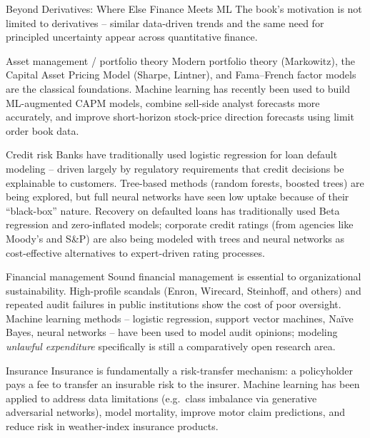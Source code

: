 \documentclass[aspectratio=169,10pt]{beamer}
\begin{document}
\begin{frame}[allowframebreaks]{Beyond Derivatives: Where Else Finance Meets ML}
  The book's motivation is not limited to derivatives -- similar
  data-driven trends and the same need for principled uncertainty appear
  across quantitative finance.

  \begin{block}{Asset management / portfolio theory}
    Modern portfolio theory (Markowitz), the Capital Asset Pricing Model
    (Sharpe, Lintner), and Fama--French factor models are the classical
    foundations. Machine learning has recently been used to build
    ML-augmented CAPM models, combine sell-side analyst forecasts more
    accurately, and improve short-horizon stock-price direction forecasts
    using limit order book data.
  \end{block}

  \begin{block}{Credit risk}
    Banks have traditionally used logistic regression for loan default
    modeling -- driven largely by regulatory requirements that credit
    decisions be explainable to customers. Tree-based methods (random
    forests, boosted trees) are being explored, but full neural networks
    have seen low uptake because of their ``black-box'' nature. Recovery on
    defaulted loans has traditionally used Beta regression and zero-inflated
    models; corporate credit ratings (from agencies like Moody's and S\&P)
    are also being modeled with trees and neural networks as
    cost-effective alternatives to expert-driven rating processes.
  \end{block}

  \framebreak

  \begin{block}{Financial management}
    Sound financial management is essential to organizational
    sustainability. High-profile scandals (Enron, Wirecard, Steinhoff, and
    others) and repeated audit failures in public institutions show the
    cost of poor oversight. Machine learning methods -- logistic
    regression, support vector machines, Na\"ive Bayes, neural networks --
    have been used to model audit opinions; modeling \emph{unlawful
    expenditure} specifically is still a comparatively open research area.
  \end{block}

  \begin{block}{Insurance}
    Insurance is fundamentally a risk-transfer mechanism: a policyholder
    pays a fee to transfer an insurable risk to the insurer. Machine
    learning has been applied to address data limitations (e.g.\ class
    imbalance via generative adversarial networks), model mortality,
    improve motor claim predictions, and reduce risk in weather-index
    insurance products.
  \end{block}
\end{frame}
\end{document}
